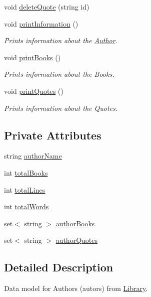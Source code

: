 \begin{DoxyCompactItemize}
\item 
void \hyperlink{class_author_aad88fc33465c64222cc86eaab8268f51}{delete\+Quote} (string id)
\item 
void \hyperlink{class_author_a9dff52e2a8bd67ff4509eb00f9235155}{print\+Information} ()
\begin{DoxyCompactList}\small\item\em Prints information about the \hyperlink{class_author}{Author}. \end{DoxyCompactList}\item 
void \hyperlink{class_author_a108714e7e120b05eaf431bb4a55b9383}{print\+Books} ()
\begin{DoxyCompactList}\small\item\em Prints information about the Books. \end{DoxyCompactList}\item 
void \hyperlink{class_author_ab37db4641af2bae8c9b72702526460a7}{print\+Quotes} ()
\begin{DoxyCompactList}\small\item\em Prints information about the Quotes. \end{DoxyCompactList}\end{DoxyCompactItemize}
\subsection*{Private Attributes}
\begin{DoxyCompactItemize}
\item 
string \hyperlink{class_author_a146b76b89d701097c36fb5d29df27bc4}{author\+Name}
\item 
int \hyperlink{class_author_ac870b8c861aa0f69cd2c4e7b8d414902}{total\+Books}
\item 
int \hyperlink{class_author_a8d818414bbd909287641b388601bf61a}{total\+Lines}
\item 
int \hyperlink{class_author_a478c72fff965eb1ee8fcaddfe173715b}{total\+Words}
\item 
set$<$ string $>$ \hyperlink{class_author_ad9ffe450cdafed2242936f6fcafa22b4}{author\+Books}
\item 
set$<$ string $>$ \hyperlink{class_author_ad505d991f439d28c4831828952e01fb6}{author\+Quotes}
\end{DoxyCompactItemize}


\subsection{Detailed Description}
Data model for Authors (autors) from \hyperlink{class_library}{Library}. 

